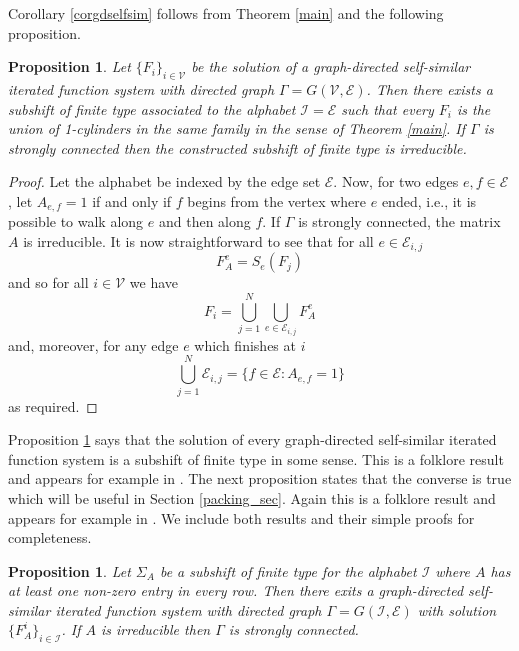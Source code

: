 \documentclass[11pt,english,british]{article}
\numberwithin{equation}{section}
\newtheorem{prop}[thm]{Proposition}
\begin{document}
Corollary \ref{corgdselfsim} follows from Theorem \ref{main} and the following proposition.

\begin{prop} \label{prop_gda2ssoft}
Let $\{F_{i}\}_{i  \in \mathcal{V}}$ be the solution of a graph-directed self-similar iterated function system with directed graph $\Gamma = G(\mathcal{V}, \mathcal{E})$. Then there exists a subshift of finite type associated to the alphabet $\mathcal{I}=\mathcal{E}$ such that every $F_{i}$ is the union of 1-cylinders in the same family in the sense of Theorem \ref{main}. If $\Gamma$ is strongly connected then the constructed subshift of finite type is irreducible.
\end{prop}

\begin{proof}
Let the alphabet be indexed by the edge set $\mathcal{E}$. Now,  for two edges $e,f \in \mathcal{E}$, let $A_{e,f} = 1$ if and only if $f$ begins from the vertex where $e$ ended, i.e., it is possible to walk along $e$ and then along $f$. If $\Gamma$ is strongly connected, the matrix $A$ is irreducible.  It is now straightforward to see that for all $e \in \mathcal{E}_{i,j}$
\[
F_A^e = S_e(F_j)
\]
and so for all $i \in \mathcal{V}$ we have
\[
F_i = \bigcup_{j = 1}^{N} \bigcup_{e \in \mathcal{E}_{i,j}} F_A^e
\]
and, moreover, for any edge $e$ which finishes at $i$
\[
\bigcup_{j = 1}^{N} \mathcal{E}_{i,j} = \{ f \in  \mathcal{E} : A_{e,f} = 1\}
\]
as required.
\end{proof}

Proposition \ref{prop_gda2ssoft} says that the solution of every graph-directed self-similar iterated function system is a subshift of finite type in some sense. This is a folklore result and appears for example in \cite[Proposition 2.2.6]{lind}. The next proposition states that the converse is true which will be useful in Section \ref{packing_sec}.  Again this is a folklore result and appears for example in \cite[Proposition 2.3.9]{lind}.  We include both results and their simple proofs for completeness.

\begin{prop} \label{prop_ssoft2gda}
Let $\Sigma_{A}$ be a subshift of finite type for the alphabet $\mathcal{I}$ where $A$ has at least one non-zero entry in every row. Then there exits a graph-directed self-similar iterated function system with directed graph $\Gamma = G(\mathcal{I}, \mathcal{E})$ with solution $\{F_{A}^{i}\}_{i  \in \mathcal{I}}$. If $A$ is irreducible then $\Gamma$ is strongly connected.
\end{prop}
\end{document}
